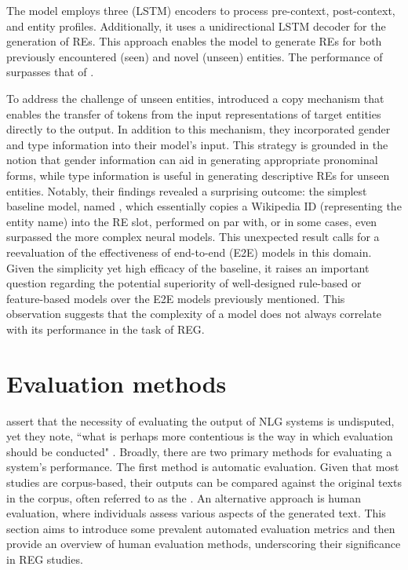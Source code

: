 The  model employs three  (LSTM) encoders to process pre-context, post-context, and entity profiles. Additionally, it uses a unidirectional LSTM decoder for the generation of REs. This approach enables the model to generate REs for both previously encountered (seen) and novel (unseen) entities. The performance of  surpasses that of .

To address the challenge of unseen entities, \citet{cunha-etal-2020-referring} introduced a copy mechanism that enables the transfer of tokens from the input representations of target entities directly to the output. In addition to this mechanism, they incorporated gender and type information into their model's input. This strategy is grounded in the notion that gender information can aid in generating appropriate pronominal forms, while type information is useful in generating descriptive REs for unseen entities. Notably, their findings revealed a surprising outcome: the simplest baseline model, named , which essentially copies a Wikipedia ID (representing the entity name) into the RE slot, performed on par with, or in some cases, even surpassed the more complex neural models. This unexpected result calls for a reevaluation of the effectiveness of end-to-end (E2E) models in this domain.
Given the simplicity yet high efficacy of the  baseline, it raises an important question regarding the potential superiority of well-designed rule-based or feature-based models over the E2E models previously mentioned. This observation suggests that the complexity of a model does not always correlate with its performance in the task of REG.


\section{Evaluation methods}\label{sec:evaluationtheory}

 assert that the necessity of evaluating the output of NLG systems is undisputed, yet they note, ``what is perhaps more contentious is the way in which evaluation should be conducted" \citep[355]{van2019best}. Broadly, there are two primary methods for evaluating a system's performance. The first method is automatic evaluation. Given that most \context studies are corpus-based, their outputs can be compared against the original texts in the corpus, often referred to as the . An alternative approach is human evaluation, where individuals assess various aspects of the generated text. This section aims to introduce some prevalent automated evaluation metrics and then provide an overview of human evaluation methods, underscoring their significance in REG studies.

